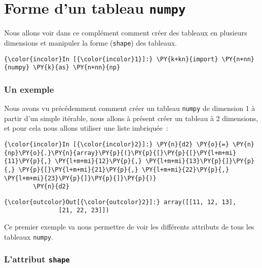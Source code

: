     
    
    
    

    

    \hypertarget{forme-dun-tableau-numpy}{%
\section{\texorpdfstring{Forme d'un tableau
\texttt{numpy}}{Forme d'un tableau numpy}}\label{forme-dun-tableau-numpy}}

    Nous allons voir dans ce complément comment créer des tableaux en
plusieurs dimensions et manipuler la forme (\texttt{shape}) des
tableaux.

    \begin{Verbatim}[commandchars=\\\{\}]
{\color{incolor}In [{\color{incolor}1}]:} \PY{k+kn}{import} \PY{n+nn}{numpy} \PY{k}{as} \PY{n+nn}{np}
\end{Verbatim}


    \hypertarget{un-exemple}{%
\subsubsection{Un exemple}\label{un-exemple}}

    Nous avons vu précédemment comment créer un tableau \texttt{numpy} de
dimension 1 à partir d'un simple itérable, nous allons à présent créer
un tableau à 2 dimensions, et pour cela nous allons utiliser une liste
imbriquée~:

    \begin{Verbatim}[commandchars=\\\{\}]
{\color{incolor}In [{\color{incolor}2}]:} \PY{n}{d2} \PY{o}{=} \PY{n}{np}\PY{o}{.}\PY{n}{array}\PY{p}{(}\PY{p}{[}\PY{p}{[}\PY{l+m+mi}{11}\PY{p}{,} \PY{l+m+mi}{12}\PY{p}{,} \PY{l+m+mi}{13}\PY{p}{]}\PY{p}{,} \PY{p}{[}\PY{l+m+mi}{21}\PY{p}{,} \PY{l+m+mi}{22}\PY{p}{,} \PY{l+m+mi}{23}\PY{p}{]}\PY{p}{]}\PY{p}{)}
        \PY{n}{d2}
\end{Verbatim}


\begin{Verbatim}[commandchars=\\\{\}]
{\color{outcolor}Out[{\color{outcolor}2}]:} array([[11, 12, 13],
               [21, 22, 23]])
\end{Verbatim}
            
    Ce premier exemple va nous permettre de voir les différents attributs de
tous les tableaux \texttt{numpy}.

    \hypertarget{lattribut-shape}{%
\subsubsection{\texorpdfstring{L'attribut
\texttt{shape}}{L'attribut shape}}\label{lattribut-shape}}

